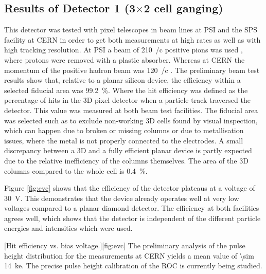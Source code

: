 \subsection{Results of Detector 1 (3$\times$2 cell ganging)}
This detector was tested with pixel telescopes in beam lines at \ac{PSI} and the SPS facility at CERN in order to get both measurements at high rates as well as with high tracking resolution. At \ac{PSI} a beam of \SI{210}{\mev/c} positive pions was used \cite{pim1}, where protons were removed with a plastic absorber. Whereas at CERN the momentum of the positive hadron beam was \SI{120}{\gev/c} \cite{h6}. The preliminary beam test results show that, relative to a planar silicon device, the efficiency within a selected fiducial area was \SI{99.2}{\%}. Where the hit efficiency was defined as the percentage of hits in the 3D pixel detector when a particle track traversed the detector. This value was measured at both beam test facilities. The fiducial area was selected such as to exclude non-working 3D cells found by visual inspection, which can happen due to broken or missing columns or due to metallisation issues, where the metal is not properly connected to the electrodes. A small discrepancy between a 3D and a fully efficient planar device is partly expected due to the relative inefficiency of the columns themselves. The area of the 3D columns compared to the whole cell is \SI{.4}{\%}. \par 
Figure \vref{fig:evc} shows that the efficiency of the detector plateaus at a voltage of \SI{30}{\volt}. This demonstrates that the device already operates well at very low voltages compared to a planar diamond detector. The efficiency at both facilities agrees well, which shows that the detector is independent of the different particle energies and intensities which were used.\par 
{}[Hit efficiency vs. bias voltage.][fig:evc]
The preliminary analysis of the pulse height distribution for the measurements at CERN yields a mean value of \SI{\sim 14}{\kilo e}. The precise pulse height calibration of the \ac{ROC} is currently being studied.